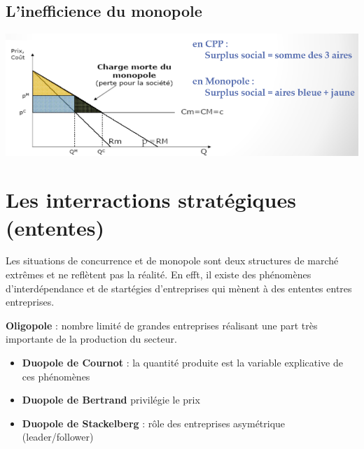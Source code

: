 \subsection{L'inefficience du monopole}
\begin{center}
    \includegraphics[scale=0.7]{Pics/Inefficience_monopole.png}
\end{center}
\newpage
\section{Les interractions stratégiques (ententes)}
Les situations de concurrence et de monopole sont deux structures de marché extrêmes et ne reflètent pas la réalité. En efft, il existe des phénomènes d'interdépendance et de startégies d'entreprises qui mènent à des ententes entres entreprises. \newline

\textbf{\textcolor{BrickRed}{Oligopole}} : nombre limité de grandes entreprises réalisant une part très importante de la production du secteur.
\newline
\begin{itemize}
    \item \textbf{Duopole de Cournot} : la quantité produite est la variable explicative de ces phénomènes \newline
    \item \textbf{Duopole de Bertrand} privilégie le prix \newline
    \item \textbf{Duopole de Stackelberg} : rôle des entreprises asymétrique (leader/follower)
\end{itemize}
\newpage
